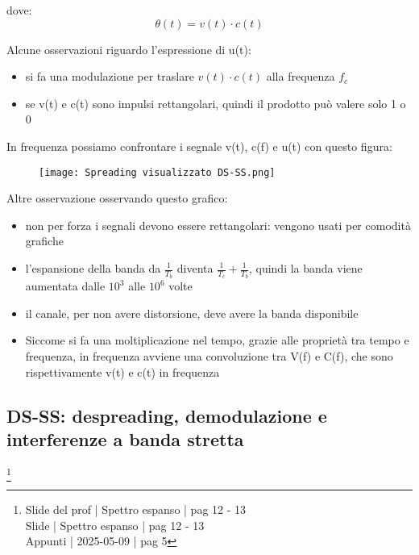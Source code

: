 dove: 
{
    \Large 
    \begin{equation}
        \theta(t) = v(t) \cdot c(t)
    \end{equation}
}

Alcune osservazioni riguardo l'espressione di u(t): 

\begin{itemize}
    \item si fa una modulazione per traslare $v(t) \cdot c(t)$ alla frequenza $f_c$
    \item se v(t) e c(t) sono impulsi rettangolari, quindi il prodotto può valere solo 1 o 0
\end{itemize}

\newpage 

In frequenza possiamo confrontare i segnale v(t), c(f) e u(t) con questo figura: 

\begin{figure}[h]
    \centering
    \texttt{[image: Spreading visualizzato DS-SS.png]}
\end{figure}

Altre osservazione osservando questo grafico: 

\begin{itemize}
    \item non per forza i segnali devono essere rettangolari: vengono usati per comodità grafiche 
    \item l'espansione della banda da $\frac{1}{T_b}$ diventa $\frac{1}{T_c} + \frac{1}{T_b}$, quindi la banda viene aumentata dalle $10^{3}$ alle $10^{6}$ volte 
    \item il canale, per non avere distorsione, deve avere la banda disponibile 
    \item Siccome si fa una moltiplicazione nel tempo, grazie alle proprietà tra tempo e frequenza, in frequenza avviene una convoluzione tra V(f) e C(f), che sono rispettivamente v(t) e c(t) in frequenza
\end{itemize}

\newpage 

\subsection{DS-SS: despreading, demodulazione e interferenze a banda stretta }
\footnote{Slide del prof | Spettro espanso | pag 12 - 13\\
Slide | Spettro espanso | pag 12 - 13 \\
Appunti | 2025-05-09 | pag 5
} 

